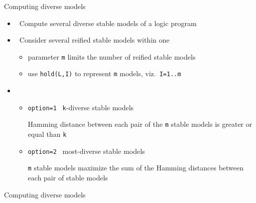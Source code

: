 \begin{frame}[fragile]{Computing diverse models}
  \bigskip
  \begin{itemize}
  \item<1->  \ Compute several diverse stable models of a logic program
    \smallskip
  \item<2->  \ Consider several reified stable models within one
    \begin{itemize}\normalsize
    \item parameter \lstinline{m} limits the number of reified stable models
    \item use \lstinline{hold(L,I)} to represent \lstinline{m} models, viz.\ \lstinline{I=1..m}
    \end{itemize}
    \bigskip
  \item<3-> 
    \begin{itemize}
    \item{\normalsize \lstinline{option=1} \ \lstinline{k}-diverse stable models}
      \par\smallskip
      Hamming distance between each pair of the \lstinline{m} stable models is greater or equal than \lstinline{k}
      \smallskip
    \item{\normalsize \lstinline{option=2} \ most-diverse stable models}
      \par\smallskip
      \lstinline{m} stable models maximize the sum of the Hamming distances between each pair of stable models
    \end{itemize}
  \end{itemize}
\end{frame}
\begin{frame}[fragile,shrink=34]{Computing diverse models}
  \bigskip
  
\end{frame}
%

